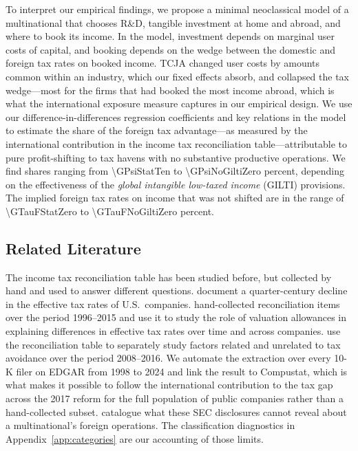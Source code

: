 \documentclass[11pt,letterpaper]{article}
\newcommand{\RoundNum}[1]{\num[round-mode=places,round-precision=0]{#1}}
\begin{document}
To interpret our empirical findings, we propose a minimal neoclassical model
of a multinational that chooses R\&D, tangible investment at home and abroad,
and where to book its income. In the model,
investment depends on marginal user costs of capital, and
booking depends on the wedge between the domestic and foreign tax
rates on booked income. TCJA changed user costs by amounts common
within an industry, which our fixed effects absorb, and collapsed the tax
wedge---most for the firms that had booked the most income abroad,
which is what the international exposure measure captures
in our empirical design. We use our difference-in-differences
regression coefficients and key relations in the model to estimate
the share of the foreign tax advantage---as measured by the
international contribution in the income tax reconciliation 
table---attributable to pure profit-shifting to tax havens
with no substantive productive operations. We find shares
ranging from \RoundNum{\GPsiStatTen} to \RoundNum{\GPsiNoGiltiZero}
percent, depending on the effectiveness of the \emph{global
intangible low-taxed income} (GILTI) provisions. The
implied foreign tax rates on income that was not shifted are in the
range of \RoundNum{\GTauFStatZero} to
\RoundNum{\GTauFNoGiltiZero} percent.  


\subsection{Related Literature}

The income tax reconciliation table has been studied before, but collected by hand 
and used to answer different questions. \citet{DyrengHanlonMaydewThornock2017} 
document a quarter-century decline in the effective tax rates of U.S.~companies. 
\citet{DrakeHamiltonLusch2020} hand-collected reconciliation items 
over the period 1996--2015 and use it to study the role of valuation allowances in
explaining differences in effective tax rates over time and across companies.
\citet{SchwabStombergXia2022} use the reconciliation table to separately 
study factors related and unrelated to tax avoidance over the period 2008--2016.
We automate the extraction 
over every 10-K filer on EDGAR from 1998 to 2024 and link the result to 
Compustat, which is what makes it possible to follow the international 
contribution to the tax gap across the 2017 reform for the full 
population of public companies rather than a hand-collected subset. 
\citet{DonohoeMcGillOutslay2012} catalogue what these SEC disclosures 
cannot reveal about a multinational's foreign operations. The
classification diagnostics in Appendix~\ref{app:categories} 
are our accounting of those limits.
\end{document}
